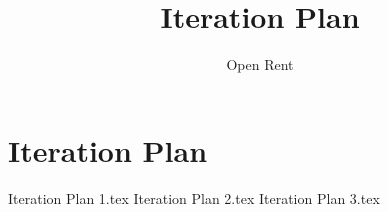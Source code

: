 \documentclass[a4paper,11pt]{book}
\title{Iteration Plan}
\author{Open Rent}
\begin{document}
\chapter{Iteration Plan}
{Iteration Plan 1.tex}
{Iteration Plan 2.tex}
{Iteration Plan 3.tex}
\end{document}
